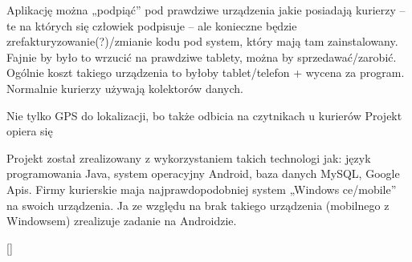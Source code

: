 \documentclass[eng,printmode,oneside]{mgr}
\begin{document}
Aplikację można „podpiąć” pod prawdziwe urządzenia jakie posiadają kurierzy – te
na których się człowiek podpisuje – ale konieczne będzie
zrefakturyzowanie(?)/zmianie kodu pod system, który mają tam zainstalowany.
	Fajnie by było to wrzucić na prawdziwe tablety, można by sprzedawać/zarobić.
	Ogólnie koszt takiego urządzenia to byłoby tablet/telefon + wycena za program.
	Normalnie kurierzy używają kolektorów danych.
	
	
 Nie tylko GPS do lokalizacji, bo także odbicia
na czytnikach u kurierów Projekt opiera się 

Projekt został zrealizowany z wykorzystaniem takich
technologi jak: język programowania Java, system operacyjny Android, baza danych
MySQL, Google Apis. Firmy kurierskie maja najprawdopodobniej system „Windows
ce/mobile” na swoich urządzenia. Ja ze względu na brak takiego urządzenia
(mobilnego z Windowsem) zrealizuje zadanie na Androidzie.

\ref{}


\listoffigures
\lstlistoflistings
\end{document}
